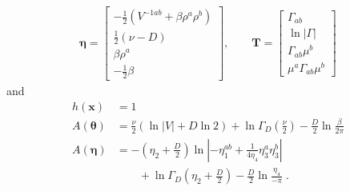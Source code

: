 \documentclass[aps,showpacs,twocolumn,prd,superscriptaddress,nofootinbib]{revtex4}
\begin{document}
\begin{align}
  \bm\eta=
\begin{bmatrix}
  -\frac12\left(V^{-1ab}+\beta\rho^a\rho^b\right)\\[.7ex]
  \frac12(\nu-D)\\[.7ex]
  \beta\rho^a\\[.7ex]
  -\frac12\beta
\end{bmatrix},\qquad
\bm T=
\begin{bmatrix}
  \Gamma_{ab}\\[.7ex]
  \ln\left|\Gamma\right|\\[.7ex]
  \Gamma_{ab}\mu^b\\[.7ex]
  \mu^a\Gamma_{ab}\mu^b
\end{bmatrix}\label{eq:NWexp}
\end{align}
and
\begin{align*}
h(\bm x)&=1\\
A(\bm\theta)&=\frac\nu2\left(\ln|V|+D\ln2\right)+\ln \Gamma_D\left(\frac\nu2\right)-\frac D2\ln\frac\beta{2\pi}\\
  A(\bm\eta)&=
      {-\!}\left(\eta_2+\frac{D}2\right)\ln\left|-\eta_1^{ab}+\frac1{4\eta_4}\eta_3^a\eta_3^b\right|\\
     &\qquad+\ln \Gamma_D\left(\eta_2+\frac{D}2\right)-\frac D2\ln\frac{\eta_4}{-\pi}\;.
\end{align*}
\end{document}

